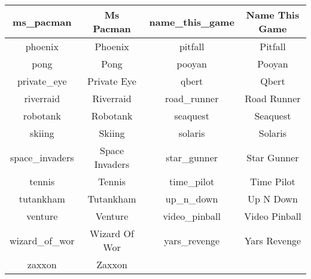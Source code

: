 \begin{center}
\begin{longtable}{ |c||c|c||c| }
        \hline
        ms\_pacman & Ms Pacman & name\_this\_game & Name This Game\\ 
        \hline
        phoenix & Phoenix & pitfall & Pitfall\\ 
        \hline
        pong & Pong & pooyan & Pooyan\\ 
        \hline
        private\_eye & Private Eye & qbert & Qbert\\ 
        \hline
        riverraid & Riverraid & road\_runner & Road Runner\\ 
        \hline
        robotank & Robotank & seaquest & Seaquest\\ 
        \hline
        skiing & Skiing & solaris & Solaris\\ 
        \hline
        space\_invaders & Space Invaders & star\_gunner & Star Gunner\\ 
        \hline
        tennis & Tennis & time\_pilot & Time Pilot\\ 
        \hline
        tutankham & Tutankham & up\_n\_down & Up N Down\\ 
        \hline
        venture & Venture & video\_pinball & Video Pinball\\ 
        \hline
        wizard\_of\_wor & Wizard Of Wor & yars\_revenge & Yars Revenge\\ 
        \hline
        zaxxon & Zaxxon \\
        \hline
    \end{longtable}
\end{center}